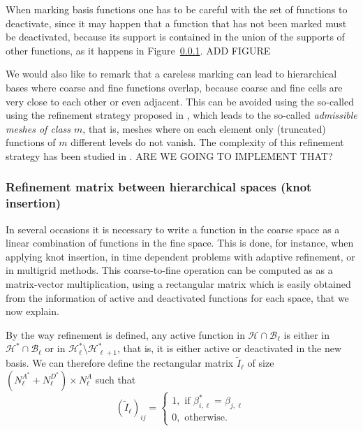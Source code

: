 \documentclass[a4paper]{siamltex1213}
\newcommand{\Rd}{\color{red}}
\renewcommand{\Rd}{\color{black}}
\newcommand\BB{\mathcal B}
\newcommand\HH{\mathcal H}
\let\tilde\widetilde
\begin{document}
When marking basis functions one has to be careful with the set of functions to deactivate, since it may happen that a function that has not been marked must be deactivated, because its support is contained in the union of the supports of other functions, as it happens in Figure~\ref{}. {\Rd ADD FIGURE}

We would also like to remark that a careless marking can lead to hierarchical bases where coarse and fine functions overlap, because coarse and fine cells are very close to each other or even adjacent. This can be avoided using the so-called using the refinement strategy proposed in \cite{BGi15}, which leads to the so-called \emph{admissible meshes of class $m$}, that is, meshes where on each element only (truncated) functions of $m$ different levels do not vanish. The complexity of this refinement strategy has been studied in \cite{BGMP15}. {\Rd ARE WE GOING TO IMPLEMENT THAT?}

\subsubsection{Refinement matrix between hierarchical spaces (knot insertion)}
In several occasions it is necessary to write a function in the coarse space as a linear combination of functions in the fine space. This is done, for instance, when applying knot insertion, in time dependent problems with adaptive refinement, or in multigrid methods. This coarse-to-fine operation can be computed as as a matrix-vector multiplication, using a rectangular matrix which is easily obtained from the information of active and deactivated functions for each space, that we now explain.

By the way refinement is defined, any active function in $\HH \cap \BB_\ell$ is either in $\HH^* \cap \BB_\ell$ or in $\HH_\ell^* \setminus \HH^*_{\ell+1}$, that is, it is either active or deactivated in the new basis. We can therefore define the rectangular matrix $\tilde I_\ell$ of size $(N^{A^*}_{\ell} + N^{D^*}_{\ell}) \times N^A_\ell$ such that 
\begin{equation*}
(\tilde I_\ell)_{ij} = \left \{ 
\begin{array}{l}
1, \text{ if }  \beta^{*}_{i,\ell} = \beta_{j,\ell}\\
0, \text{ otherwise. }
\end{array}
\right.
\end{equation*}
\end{document}
